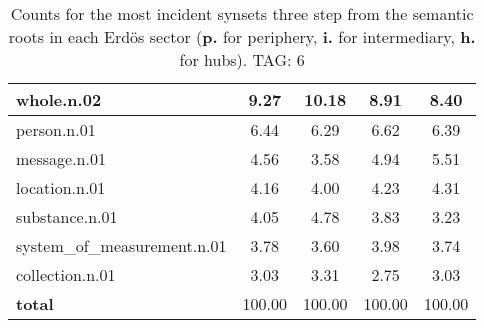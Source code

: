 \begin{table}[h!]
\begin{center}
\begin{tabular}{| l || c | c | c | c |}
whole.n.02 & 9.27  & 10.18  & 8.91  & 8.40 \\\hline
person.n.01 & 6.44  & 6.29  & 6.62  & 6.39 \\\hline
message.n.01 & 4.56  & 3.58  & 4.94  & 5.51 \\\hline
location.n.01 & 4.16  & 4.00  & 4.23  & 4.31 \\\hline
substance.n.01 & 4.05  & 4.78  & 3.83  & 3.23 \\\hline
system\_of\_measurement.n.01 & 3.78  & 3.60  & 3.98  & 3.74 \\\hline
collection.n.01 & 3.03  & 3.31  & 2.75  & 3.03 \\\hline\hline
{{\bf total}} & 100.00  & 100.00  & 100.00  & 100.00 \\\hline
\end{tabular}
\caption{Counts for the most incident synsets three step from the semantic roots in each Erd\"os sector ({\bf p.} for periphery, {\bf i.} for intermediary, {\bf h.} for hubs). TAG: 6}
\end{center}
\end{table}